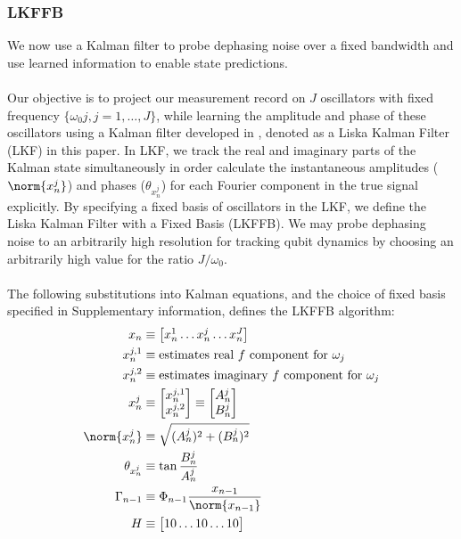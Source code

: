 \subsubsection{LKFFB}

We now use a Kalman filter to probe dephasing noise over a fixed bandwidth and use learned information to enable state predictions.
\\
\\
Our objective is to project our measurement record on $J$ oscillators with fixed frequency $\{ \omega_0 j, j = 1, \hdots, J \}$, while learning the amplitude and phase of these oscillators using a Kalman filter developed in \cite{livska2007}, denoted as a Liska Kalman Filter (LKF) in this paper. In LKF, we track the real and imaginary parts of the Kalman state  simultaneously in order calculate the instantaneous amplitudes ($\norm{x^j_n}$) and phases ($\theta_{x^j_n}$)  for each Fourier component in the true signal explicitly. By specifying a fixed basis of oscillators in the LKF, we define the Liska Kalman Filter with a Fixed Basis (LKFFB). We may probe dephasing noise to an arbitrarily high resolution for tracking qubit dynamics by choosing an arbitrarily high value for the ratio $J/\omega_0$.
\\
\\
The following substitutions into Kalman equations, and the choice of fixed basis specified in Supplementary information, defines the LKFFB algorithm:
\begin{align}
x_n & \equiv \begin{bmatrix} x^{1}_{n} \hdots x^{j}_{n} \hdots x^{J}_{n} \end{bmatrix} \\
x^{j,1}_{n} & \equiv \text{estimates real $f$ component for $\omega_j$} \\
x^{j,2}_{n} & \equiv \text{estimates imaginary $f$ component for $\omega_j$} \\
x^j_n &\equiv \begin{bmatrix} x^{j,1}_{n} \\ x^{j,2}_{n} \\ \end{bmatrix} \equiv \begin{bmatrix} A^j_{n} \\ B^j_{n}  \end{bmatrix}\\
\norm{x^j_n} & \equiv \sqrt{(A^j_{n})^2 + (B^j_{n})^2} \\
\theta_{x^j_n} & \equiv \tan{\frac{B^j_{n}}{A^j_{n}}} \\
\Gamma_{n-1} &\equiv \Phi_{n-1}\frac{x_{n-1}}{\norm{x_{n-1}}}  \\
H & \equiv \begin{bmatrix} 1 0 \hdots 1 0 \hdots 1 0 \end{bmatrix}
\end{align}
